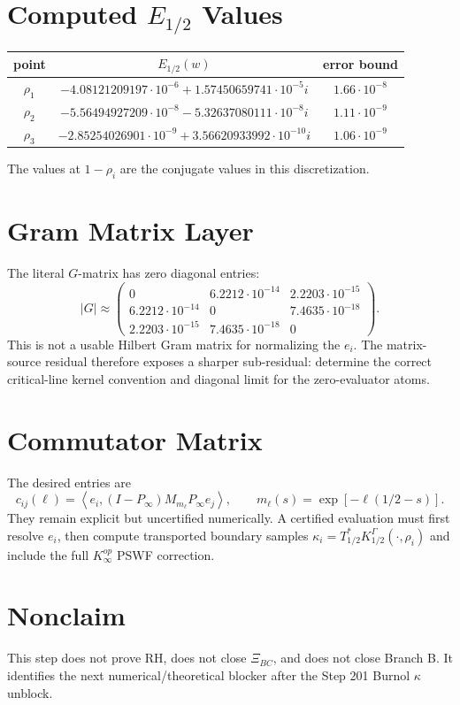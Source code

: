 \documentclass[11pt]{article}
\begin{document}
\section*{Computed \(E_{1/2}\) Values}

\begin{center}
\begin{tabular}{c c c}
\toprule
point & \(E_{1/2}(w)\) & error bound\\
\midrule
\(\rho_1\) & \(-4.08121209197\cdot 10^{-6}+1.57450659741\cdot 10^{-5}i\) & \(1.66\cdot 10^{-8}\)\\
\(\rho_2\) & \(-5.56494927209\cdot 10^{-8}-5.32637080111\cdot 10^{-8}i\) & \(1.11\cdot 10^{-9}\)\\
\(\rho_3\) & \(-2.85254026901\cdot 10^{-9}+3.56620933992\cdot 10^{-10}i\) & \(1.06\cdot 10^{-9}\)\\
\bottomrule
\end{tabular}
\end{center}

The values at \(1-\rho_i\) are the conjugate values in this discretization.

\section*{Gram Matrix Layer}

The literal \(G\)-matrix has zero diagonal entries:
\[
|G|\approx
\begin{pmatrix}
0 & 6.2212\cdot10^{-14} & 2.2203\cdot10^{-15}\\
6.2212\cdot10^{-14} & 0 & 7.4635\cdot10^{-18}\\
2.2203\cdot10^{-15} & 7.4635\cdot10^{-18} & 0
\end{pmatrix}.
\]
This is not a usable Hilbert Gram matrix for normalizing the \(e_i\).  The
matrix-source residual therefore exposes a sharper sub-residual:
determine the correct critical-line kernel convention and diagonal limit for
the zero-evaluator atoms.

\section*{Commutator Matrix}

The desired entries are
\[
c_{ij}(\ell)=
\left\langle e_i,(I-P_\infty)M_{m_\ell}P_\infty e_j\right\rangle,
\qquad
m_\ell(s)=\exp[-\ell(1/2-s)].
\]
They remain explicit but uncertified numerically.  A certified evaluation must
first resolve \(e_i\), then compute transported boundary samples
\(\kappa_i=T_{1/2}^*K_{1/2}^\Gamma(\cdot,\rho_i)\) and include the full
\(K_\infty^{op}\) PSWF correction.

\section*{Nonclaim}

This step does not prove RH, does not close \(\Xi_{BC}\), and does not close
Branch B.  It identifies the next numerical/theoretical blocker after the
Step 201 Burnol \(\kappa\) unblock.
\end{document}
